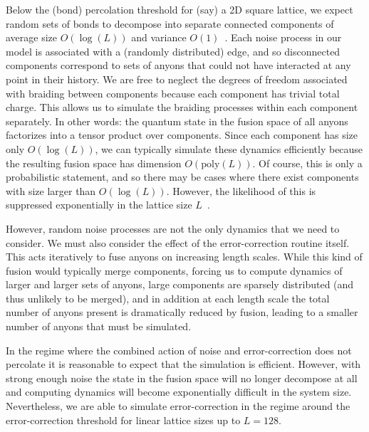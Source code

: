 \documentclass[aps, prl, letterpaper, twocolumn, superscriptaddress, notitlepage, 10pt]{revtex4-1}
\begin{document}
Below the (bond) percolation threshold for (say) a 2D square lattice, we expect random sets of 
bonds to decompose into separate connected components 
of average size $O(\log(L))$ and variance $O(1)$~\cite{Bazant2000}.
Each noise process in our model is associated with a (randomly distributed) edge, and so 
disconnected components correspond to sets of anyons that could not have interacted at any 
point in their history. 
We are free to neglect the degrees of freedom associated with braiding between components 
because each component has trivial total charge.
This allows us to simulate the braiding processes within each component separately. 
In other words: the quantum state in the fusion space of all anyons factorizes into 
a tensor product over components. 
Since each 
component has size only $O(\log(L))$, we can typically simulate these dynamics efficiently 
because the resulting fusion space has dimension $O(\mathrm{poly}(L))$. 
Of course, this is only a probabilistic statement, and so there may be cases where there exist components with size larger than $O(\log(L))$. However, the likelihood of this is suppressed exponentially in the lattice size $L$~\cite{Grimmett1989}. 

However, random noise processes are not the only dynamics that we need to consider. We 
must also consider the effect of the error-correction routine itself. This acts iteratively to fuse 
anyons on increasing length scales. While this kind of fusion would typically merge components, 
forcing us to compute dynamics of larger and larger sets of anyons,
large components are sparsely distributed
(and thus unlikely to be merged), and in addition at each length scale the total number of 
anyons present is dramatically reduced by fusion, leading to a smaller number of anyons that 
must be simulated.

In the regime where the combined action of noise and error-correction does not percolate
it is reasonable to expect that the simulation is efficient.
However, with strong enough noise the state in the fusion space will
no longer decompose at all and computing dynamics will
become exponentially difficult in the system size.
Nevertheless, we are able to simulate error-correction in
the regime around the error-correction threshold for linear lattice sizes up to $L=128$.

\end{document}
